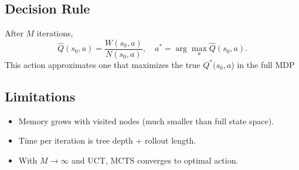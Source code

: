 \documentclass[12pt,a4paper]{cibb}
\begin{document}
\subsection*{Decision Rule}
After \(M\) iterations,
\[
 \hat Q(s_0,a)=\frac{W(s_0,a)}{N(s_0,a)},\quad a^*=\arg\max_a \hat Q(s_0,a).
\]
This action approximates one that maximizes the true $Q^*(s_0,a$) in the full MDP

\subsection*{Limitations}
\begin{itemize}[leftmargin=1.5cm]
  \item Memory grows with visited nodes (much smaller than full state space).  
  \item Time per iteration is tree depth + rollout length.  
  \item With \(M\to\infty\) and UCT, MCTS converges to optimal action.  
\end{itemize}
\end{document}
